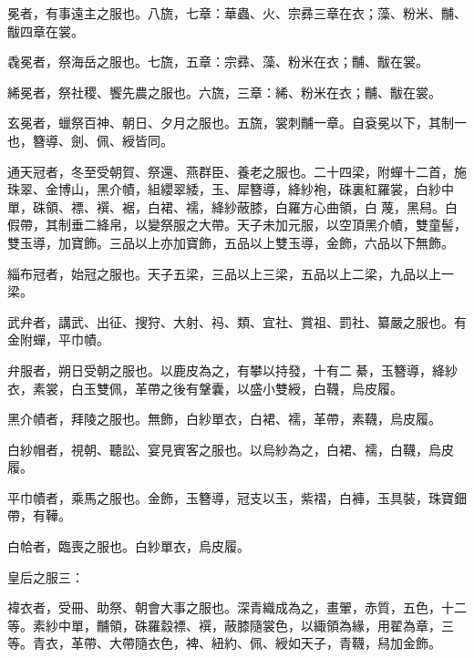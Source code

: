 \begin{pinyinscope}
 冕者，有事遠主之服也。八旒，七章：華蟲、火、宗彞三章在衣；藻、粉米、黼、黻四章在裳。



 毳冕者，祭海岳之服也。七旒，五章：宗彞、藻、粉米在衣；黼、黻在裳。



 絺冕者，祭社稷、饗先農之服也。六旒，三章：絺、粉米在衣；黼、黻在裳。



 玄冕者，蠟祭百神、朝日、夕月之服也。五旒，裳刺黼一章。自袞冕以下，其制一也，簪導、劍、佩、綬皆同。



 通天冠者，冬至受朝賀、祭還、燕群臣、養老之服也。二十四梁，附蟬十二首，施珠翠、金博山，黑介幘，組纓翠緌，玉、犀簪導，絳紗袍，硃裏紅羅裳，白紗中單，硃領、褾、襈、裾，白裙、襦，絳紗蔽膝，白羅方心曲領，白蔑，黑舄。白假帶，其制垂二絳帛，以變祭服之大帶。天子未加元服，以空頂黑介幘，雙童髻，雙玉導，加寶飾。三品以上亦加寶飾，五品以上雙玉導，金飾，六品以下無飾。



 緇布冠者，始冠之服也。天子五梁，三品以上三梁，五品以上二梁，九品以上一梁。



 武弁者，講武、出征、搜狩、大射、祃、類、宜社、賞祖、罰社、纂嚴之服也。有金附蟬，平巾幘。



 弁服者，朔日受朝之服也。以鹿皮為之，有攀以持發，十有二綦，玉簪導，絳紗衣，素裳，白玉雙佩，革帶之後有鞶囊，以盛小雙綬，白韈，烏皮履。



 黑介幘者，拜陵之服也。無飾，白紗單衣，白裙、襦，革帶，素韈，烏皮履。



 白紗帽者，視朝、聽訟、宴見賓客之服也。以烏紗為之，白裙、襦，白韈，烏皮履。



 平巾幘者，乘馬之服也。金飾，玉簪導，冠支以玉，紫褶，白褲，玉具裝，珠寶鈿帶，有鞾。



 白帢者，臨喪之服也。白紗單衣，烏皮履。



 皇后之服三：



 褘衣者，受冊、助祭、朝會大事之服也。深青織成為之，畫翬，赤質，五色，十二等。素紗中單，黼領，硃羅縠褾、襈，蔽膝隨裳色，以緅領為緣，用翟為章，三等。青衣，革帶、大帶隨衣色，裨、紐約、佩、綬如天子，青韈，舄加金飾。




\end{pinyinscope}
